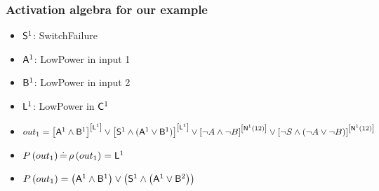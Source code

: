 \begin{frame}
\frametitle{Activation algebra for our example}

\begin{itemize}
  \item $\failurevalue{S}{1}$: SwitchFailure
  \item $\failurevalue{A}{1}$: LowPower in input 1
  \item $\failurevalue{B}{1}$: LowPower in input 2
  \item $\failurevalue{L}{1}$: LowPower in $\component{1}$
  \item $out_1 = 
  \aaexp{\failurevalue{A}{1} \land \failurevalue{B}{1}}{\failurevalue{L}{1}} \lor
  \aaexp{\failurevalue{S}{1} \land (\failurevalue{A}{1} \lor \failurevalue{B}{1})}{\failurevalue{L}{1}} \lor
  \aaexp{\lnot A \land \lnot B}{\nominalvalue{12}{1}} \lor
  \aaexp{\lnot S \land (\lnot A \lor \lnot B)}{\nominalvalue{12}{1}}
  $
  \item $P\left(out_1\right) \defs \outvalueof{out_1}=\failurevalue{L}{1}$
  \item<2-> $P\left(out_1\right) = \left(\failurevalue{A}{1} \land \failurevalue{B}{1}\right) \lor 
  \left(\failurevalue{S}{1} \land \left(\failurevalue{A}{1} \lor \failurevalue{B}{2}\right)\right)$
\end{itemize}
\end{frame}